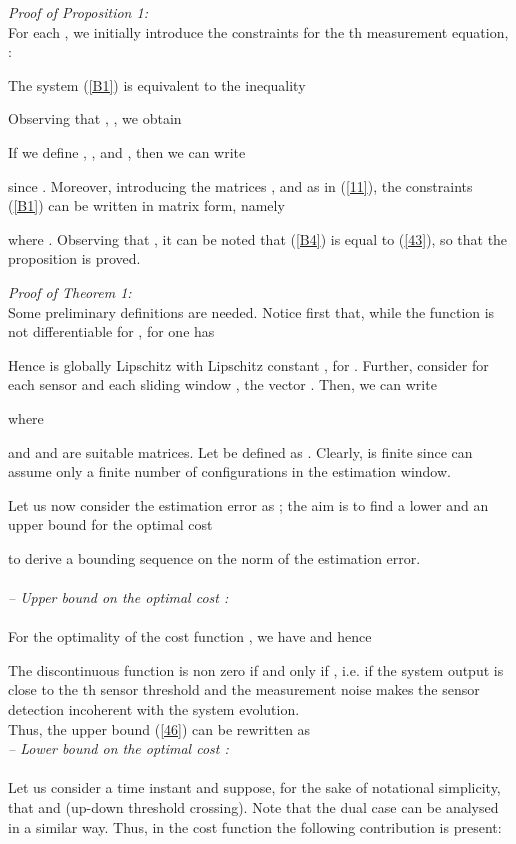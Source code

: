 \documentclass[11pt,journal,onecolumn]{IEEEtran}
\begin{document}
{\em Proof of Proposition 1:}\\
For each , we initially introduce the constraints for the th measurement equation, :

The system (\ref{B1}) is equivalent to the inequality

Observing that , , we obtain

If we define , ,  and , then we can write

since . Moreover, introducing the matrices ,  and  as in (\ref{11}), the constraints (\ref{B1}) can be written in matrix form, namely

where . Observing that , it can be noted that  (\ref{B4}) is equal to  (\ref{43}),
so that the proposition is proved. \hfill 
\vspace{.5cm}

{\em Proof of Theorem 1:}\\
Some preliminary definitions are needed. Notice first that, while the function  is not differentiable for , for  one has

Hence  is globally Lipschitz with Lipschitz constant , for . Further, consider for each sensor  and each sliding window , the vector . Then, we can write

where

and  and  are suitable matrices. Let  be defined as
. Clearly,  is finite since   can assume only a finite number of configurations in the estimation window.

Let us now consider the estimation error as ; the aim is to find a lower and an upper bound for the optimal cost

to derive a bounding sequence on the norm of the estimation error. \\ \\
\textit{-- Upper bound on the optimal cost :} \\ \\
For the optimality of the cost function , we have  and hence

The discontinuous function  is non zero if and only if , i.e. if the system output is close to the th sensor threshold and the measurement noise makes the sensor detection incoherent with the system evolution. \\
Thus, the upper bound (\ref{46}) can be rewritten as
\\
\textit{-- Lower bound on the optimal cost :} \\ \\
Let us consider a time instant  and suppose, for the sake of notational simplicity, that  and 
(up-down threshold crossing). Note that the dual case can be analysed in a similar way.
Thus, in the cost function  the following contribution is present:
\end{document}
